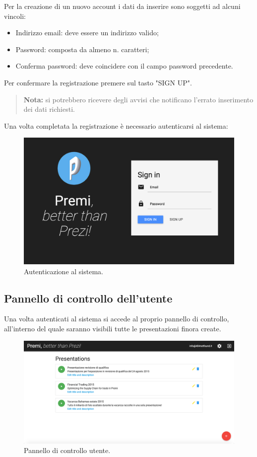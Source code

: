 Per la creazione di un nuovo account i dati da inserire sono soggetti ad alcuni vincoli:
\begin{itemize}
\item Indirizzo email: deve essere un indirizzo valido;
\item Password: composta da almeno n. caratteri;
\item Conferma password: deve coincidere con il campo password precedente.
\end{itemize}
Per confermare la registrazione premere sul tasto "SIGN UP".
\begin{quote}
\textbf{Nota:} si potrebbero ricevere degli avvisi che notificano l'errato inserimento dei dati richiesti.
\end{quote}
Una volta completata la registrazione è necessario autenticarsi al sistema:
\begin{figure}[h]
\begin{center}
\includegraphics[scale=0.4]{img/signin.png}
\caption{Autenticazione al sistema.}
\end{center}
\end{figure}

\newpage
\subsection{Pannello di controllo dell'utente}
Una volta autenticati al sistema si accede al proprio pannello di controllo, all'interno del quale saranno visibili tutte le presentazioni finora create.
\begin{figure}[h]
\begin{center}
\includegraphics[scale=0.35]{img/dashboard.png}
\caption{Pannello di controllo utente.}
\end{center}
\end{figure}

